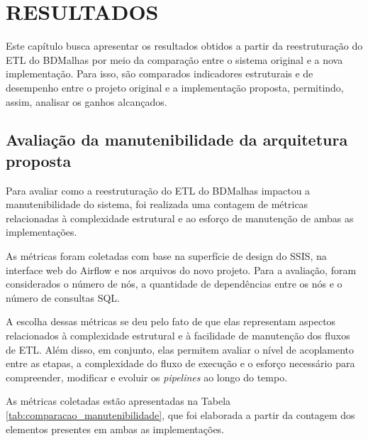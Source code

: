 
\chapter{RESULTADOS}
\label{cap:resultados}
\thispagestyle{myheadings}

Este capítulo busca apresentar os resultados obtidos a partir da reestruturação do 
ETL do BDMalhas por meio da comparação entre o sistema original e a nova implementação.
Para isso, são comparados indicadores estruturais e de desempenho entre o projeto original e 
a implementação proposta, permitindo, assim, analisar os ganhos alcançados.

\section{Avaliação da manutenibilidade da arquitetura proposta}

Para avaliar como a reestruturação do ETL do BDMalhas impactou a manutenibilidade do sistema, 
foi realizada uma contagem de métricas relacionadas à complexidade estrutural e ao esforço de 
manutenção de ambas as implementações.

As métricas foram coletadas com base na superfície de design do SSIS, na interface web do Airflow 
e nos arquivos do novo projeto. Para a avaliação, foram considerados o número de nós, a quantidade 
de dependências entre os nós e o número de consultas SQL.

A escolha dessas métricas se deu pelo fato de que elas representam aspectos
relacionados à complexidade estrutural e à facilidade de manutenção dos fluxos de ETL. Além disso,
em conjunto, elas permitem avaliar o nível de acoplamento entre as etapas, a complexidade do fluxo 
de execução e o esforço necessário para compreender, modificar e evoluir os \textit{pipelines} 
ao longo do tempo.

As métricas coletadas estão apresentadas na Tabela \ref{tab:comparacao_manutenibilidade},
que foi elaborada a partir da contagem dos elementos presentes em ambas as implementações.



